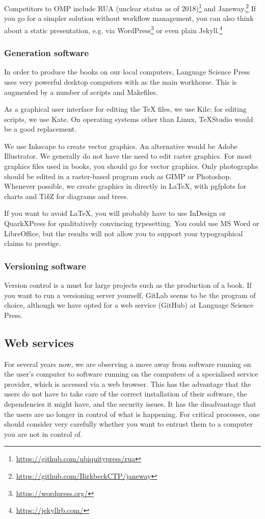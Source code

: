 \documentclass[nonflat,modfonts,output=book] {langsci/langscibook}
\newcommand{\footurl}[1]{\footnote{\url{#1}}}
\begin{document}
Competitors to OMP include RUA (unclear status as of 2018)\footurl{https://github.com/ubiquitypress/rua} and Janeway.\footurl{https://github.com/BirkbeckCTP/janeway} If you go for a simpler solution without workflow management, you can also think about a static presentation, e.g. via WordPress\footurl{https://wordpress.org/} or even plain Jekyll.\footurl{https://jekyllrb.com/} 

\largerpage
\subsubsection{Generation software}
In order to produce the books on our local computers, Language Science Press uses very powerful desktop computers with \xelatex as the main workhorse. This is augmented by a number of scripts and Makefiles. 

As a graphical user interface for editing the TeX files, we use Kile; for editing scripts, we use Kate. On operating systems other than Linux, TeXStudio would be a good replacement. 

We use Inkscape to create vector graphics. An alternative would be Adobe Illustrator. We generally do not have the need to edit raster graphics. For most graphics files used in books, you should go for vector graphics. Only photographs should be edited in a raster-based program such as GIMP or Photoshop. Whenever possible, we create graphics in directly in \LaTeX\xspace, with pgfplots for charts and Ti\textit{k}Z for diagrams and trees. 

If you want to avoid \LaTeX\xspace, you will probably have to use InDesign or QuarkXPress for qualitatively convincing typesetting. You could use MS Word or LibreOffice, but the results will not allow you to support your typographical claims to prestige.


\subsubsection{Versioning software}
Version control is a must for large projects such as the production of a book. If you want to run a versioning server yourself, GitLab seems to be the program of choice, although we have opted for a web service (GitHub) at Language Science Press. 

\subsection{Web services}
For several years now, we are observing a move away from software running on the user's computer to software running on the computers of a specialised service provider, which is accessed via a web browser. This has the advantage that the users do not have to take care of the correct installation of their software, the dependencies it might have, and the security issues. It has the disadvantage that the users are no longer in control of what is happening. For critical processes, one should consider very carefully whether you want to entrust them to a computer you are not in control of. 
\end{document}
